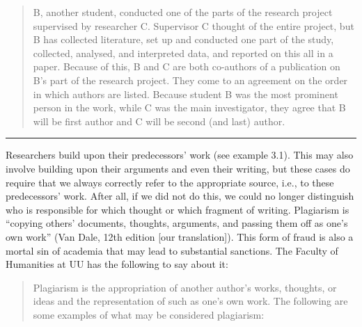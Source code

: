 \documentclass[
]{book}
\begin{document}
\begin{quote}
B, another student, conducted one of the parts of the research project supervised by researcher C. Supervisor C thought of the entire project, but B has collected literature, set up and conducted one part of the study, collected, analysed, and interpreted data, and reported on this all in a paper. Because of this, B and C are both co-authors of a publication on B's part of the research project. They come to an agreement on the order in which authors are listed. Because student B was the most prominent person in the work, while C was the main investigator, they agree that B will be first author and C will be second (and last) author.
\end{quote}

\begin{center}\rule{0.5\linewidth}{0.5pt}\end{center}

Researchers build upon their predecessors' work (see example 3.1). This may also involve building upon their arguments and even their writing, but these cases do require that we always correctly refer to the appropriate source, i.e., to these predecessors' work. After all, if we did not do this, we could no longer distinguish who is responsible for which thought or which fragment of writing. Plagiarism is ``copying others' documents, thoughts, arguments, and passing them off as one's own work'' (Van Dale, 12th edition {[}our translation{]}). This form of fraud is also a mortal sin of academia that may lead to substantial sanctions. The Faculty of Humanities at UU has the following to say about it:

\begin{quote}
Plagiarism is the appropriation of another author's works, thoughts, or ideas and the representation of such as one's own work. The following are some examples of what may be considered plagiarism:
\end{quote}
\end{document}

